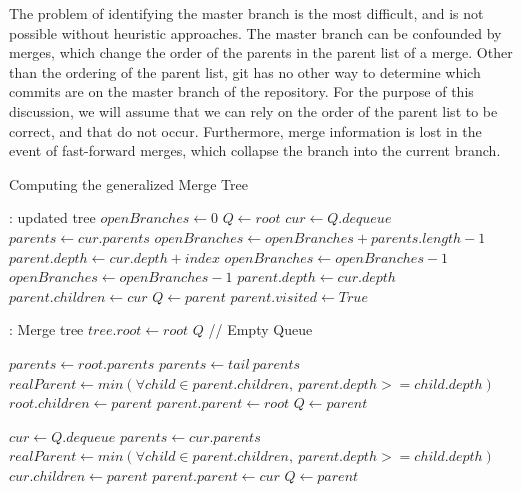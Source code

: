 The problem of identifying the master branch is the most difficult, and is
not possible without heuristic approaches. The master branch can be
confounded by \foxtrot merges, which change the order of the
parents in the parent list of a merge. Other than the ordering of the
parent list, git has no other way to determine which commits are on the
master branch of the repository. For the purpose of this discussion, we
will assume that we can rely on the order of the parent list to be
correct, and that  do not occur. Furthermore, merge
information is lost in the event of fast-forward merges, which collapse
the branch into the current branch.

\begin{algorithm}
  \caption{Computing the generalized Merge Tree}
  \label{alg:generalized}
  \begin{algorithmic}[1]
     : updated tree
    \State $openBranches \gets 0$
    \State $Q \gets root$
    \Do
    \State $cur \gets Q.dequeue$
    \State $parents \gets cur.parents$
    \State $openBranches \gets openBranches + parents.length - 1$
    \State $parent.depth \gets cur.depth + index$
    \State $openBranches \gets openBranches - 1$
    \State $openBranches \gets openBranches - 1$
    \State $parent.depth \gets cur.depth$
    \EndIf
    \State $parent.children \gets cur$
    \State $Q \gets parent$
    \State $parent.visited \gets True$
    \EndIf
    \EndFor
    \EndFunction

     : Merge tree
    \State $tree.root \gets root$
    \State $Q$ // Empty Queue

    \State $parents \gets root.parents$
    \State $parents \gets tail\ parents$
    \State $realParent \gets min(\forall child \in parent.children,\ parent.depth >= child.depth)$
    \State $root.children \gets parent$
    \State $parent.parent \gets root$
    \State $Q \gets parent$
    \EndIf
    \EndFor

    \State $cur \gets Q.dequeue$
    \State $parents \gets cur.parents$
    \State $realParent \gets min(\forall child \in parent.children,\ parent.depth >= child.depth)$
    \State $cur.children \gets parent$
    \State $parent.parent \gets cur$
    \State $Q \gets parent$
    \EndIf

    \EndFor
    \EndWhile

    \EndFunction
  \end{algorithmic}
\end{algorithm}

